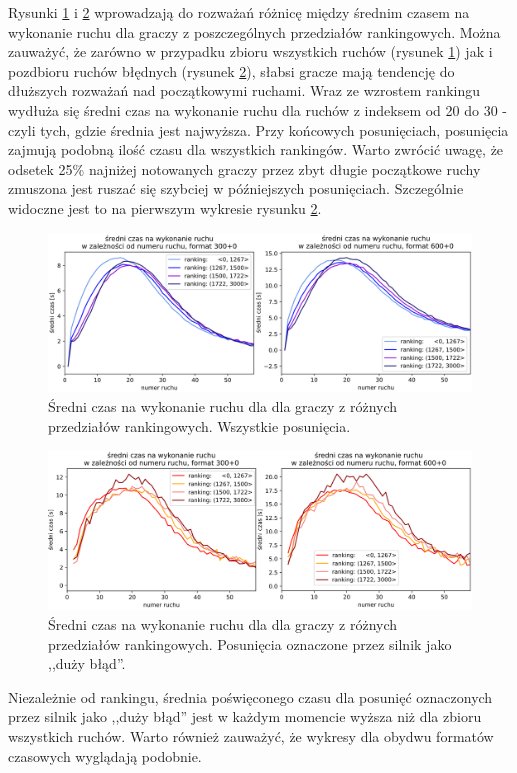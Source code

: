 \documentclass[inzynierska]{pwr_wmat_praca_dyplomowa}
\theoremstyle{plain}
\numberwithin{theorem}{chapter}
\theoremstyle{definition}
\numberwithin{theorem}{chapter}
\begin{document}
Rysunki \ref{rys:sr_czas_na_ruch_ELO_1} i \ref{rys:sr_czas_na_ruch_ELO_2} wprowadzają do rozważań różnicę między średnim czasem na wykonanie ruchu dla graczy z poszczególnych przedziałów rankingowych. Można zauważyć, że zarówno w przypadku zbioru wszystkich ruchów (rysunek \ref{rys:sr_czas_na_ruch_ELO_1}) jak i pozdbioru ruchów błędnych (rysunek \ref{rys:sr_czas_na_ruch_ELO_2}), słabsi gracze mają tendencję do dłuższych rozważań nad początkowymi ruchami. Wraz ze wzrostem rankingu wydłuża się średni czas na wykonanie ruchu dla ruchów z indeksem od 20 do 30 - czyli tych, gdzie średnia jest najwyższa. Przy końcowych posunięciach, posunięcia zajmują podobną ilość czasu dla wszystkich rankingów. Warto zwrócić uwagę, że odsetek 25\% najniżej notowanych graczy przez zbyt długie początkowe ruchy zmuszona jest ruszać się szybciej w późniejszych posunięciach. Szczególnie widoczne jest to na pierwszym wykresie rysunku \ref{rys:sr_czas_na_ruch_ELO_2}. 
\begin{figure}[H]
	\centering
	\includegraphics[width=\textwidth]{sr_czas_na_ruch_ELO_1.png}
	\caption{Średni czas na wykonanie ruchu dla dla graczy z różnych przedziałów rankingowych. Wszystkie posunięcia.}
	\label{rys:sr_czas_na_ruch_ELO_1}
\end{figure}
\begin{figure}[H]
	\centering
	\includegraphics[width=\textwidth]{sr_czas_na_ruch_ELO_2.png}
	\caption{Średni czas na wykonanie ruchu dla dla graczy z różnych przedziałów rankingowych. Posunięcia oznaczone przez silnik jako ,,duży błąd''.}
	\label{rys:sr_czas_na_ruch_ELO_2}
\end{figure}
Niezależnie od rankingu, średnia poświęconego czasu dla posunięć oznaczonych przez silnik jako ,,duży błąd'' jest w każdym momencie wyższa niż dla zbioru wszystkich ruchów. 
Warto również zauważyć, że wykresy dla obydwu formatów czasowych wyglądają podobnie. 
\end{document}
